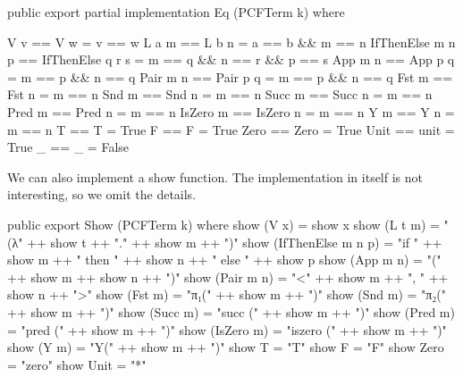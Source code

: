 \begin{code}
public export partial
implementation Eq (PCFTerm k) where

  V v              == V w              = v == w
  L a m            == L b n            = a == b && m == n
  IfThenElse m n p == IfThenElse q r s = m == q && n == r && p == s
  App m n          == App p q          = m == p && n == q
  Pair m n         == Pair p q         = m == p && n == q
  Fst m            == Fst n            = m == n
  Snd m            == Snd n            = m == n
  Succ m           == Succ n           = m == n
  Pred m           == Pred n           = m == n
  IsZero m         == IsZero n         = m == n
  Y m              == Y n              = m == n
  T                == T                = True
  F                == F                = True
  Zero             == Zero             = True
  Unit             == unit             = True
  _                == _                = False
\end{code}

We can also implement a show function. The implementation in itself is not
interesting, so we omit the details.

\begin{hidden}
public export
Show (PCFTerm k) where
  show (V x)              = show x
  show (L t m)            = "(λ" ++ show t ++ "." ++ show m ++ ")"
  show (IfThenElse m n p) = "if " ++ show m ++ " then " ++ show n ++ " else " ++ show p
  show (App m n)          = "(" ++ show m ++ show n ++ ")"
  show (Pair m n)         = "<" ++ show m ++ ", " ++ show n ++ ">"
  show (Fst m)            = "π₁(" ++ show m ++ ")"
  show (Snd m)            = "π₂(" ++ show m ++ ")"
  show (Succ m)           = "succ (" ++ show m ++ ")"
  show (Pred m)           = "pred (" ++ show m ++ ")"
  show (IsZero m)         = "iszero (" ++ show m ++ ")"
  show (Y m)              = "Y(" ++ show m ++ ")"
  show T                  = "T"
  show F                  = "F"
  show Zero               = "zero"
  show Unit               = "*"
\end{hidden}
